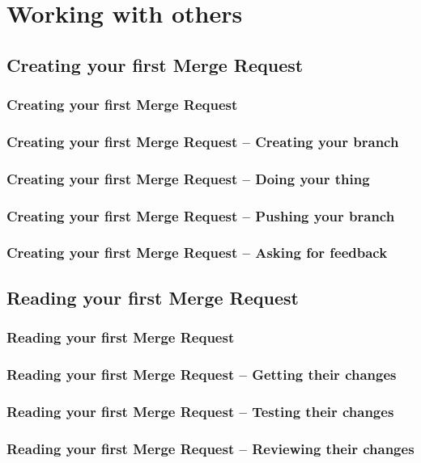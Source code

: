 \documentclass{beamer}
\begin{document}


\section{Working with others}
\subsection{Creating your first Merge Request}

\begin{frame}[fragile]
  \frametitle{Creating your first Merge Request}
\end{frame}

\begin{frame}[fragile]
  \frametitle{Creating your first Merge Request -- Creating your branch}
\end{frame}

\begin{frame}[fragile]
  \frametitle{Creating your first Merge Request -- Doing your thing}
\end{frame}

\begin{frame}[fragile]
  \frametitle{Creating your first Merge Request -- Pushing your branch}
\end{frame}

\begin{frame}[fragile]
  \frametitle{Creating your first Merge Request -- Asking for feedback}
\end{frame}

\subsection{Reading your first Merge Request}

\begin{frame}[fragile]
  \frametitle{Reading your first Merge Request}
\end{frame}

\begin{frame}[fragile]
  \frametitle{Reading your first Merge Request -- Getting their changes}
\end{frame}

\begin{frame}[fragile]
  \frametitle{Reading your first Merge Request -- Testing their changes}
\end{frame}

\begin{frame}[fragile]
  \frametitle{Reading your first Merge Request -- Reviewing their changes}  %
\end{frame}
\end{document}

